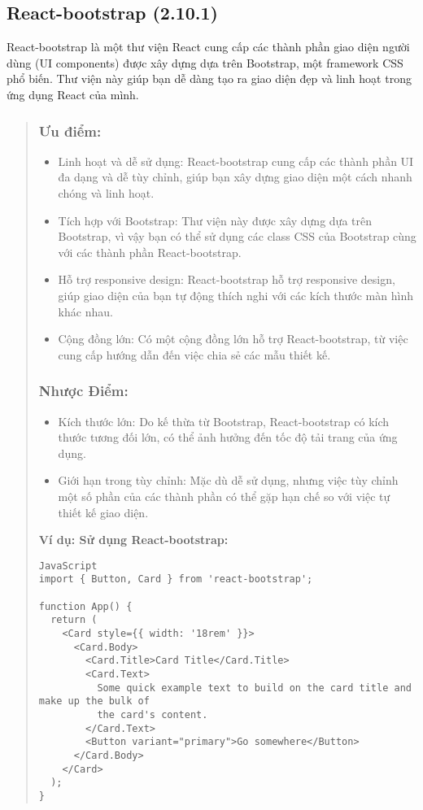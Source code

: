 \subsection{React-bootstrap (2.10.1)}

React-bootstrap là một thư viện React cung cấp các thành phần giao diện người dùng (UI components) được xây dựng dựa trên Bootstrap, một framework CSS phổ biến. Thư viện này giúp bạn dễ dàng tạo ra giao diện đẹp và linh hoạt trong ứng dụng React của mình.

\begin{quote}
\subsubsection{Ưu điểm:}
\begin{itemize}
  \item Linh hoạt và dễ sử dụng: React-bootstrap cung cấp các thành phần UI đa dạng và dễ tùy chỉnh, giúp bạn xây dựng giao diện một cách nhanh chóng và linh hoạt.
  \item Tích hợp với Bootstrap: Thư viện này được xây dựng dựa trên Bootstrap, vì vậy bạn có thể sử dụng các class CSS của Bootstrap cùng với các thành phần React-bootstrap.
  \item Hỗ trợ responsive design: React-bootstrap hỗ trợ responsive design, giúp giao diện của bạn tự động thích nghi với các kích thước màn hình khác nhau.
  \item Cộng đồng lớn: Có một cộng đồng lớn hỗ trợ React-bootstrap, từ việc cung cấp hướng dẫn đến việc chia sẻ các mẫu thiết kế.
\end{itemize}

\subsubsection{Nhược Điểm:}
\begin{itemize}
  \item Kích thước lớn: Do kế thừa từ Bootstrap, React-bootstrap có kích thước tương đối lớn, có thể ảnh hưởng đến tốc độ tải trang của ứng dụng.
  \item Giới hạn trong tùy chỉnh: Mặc dù dễ sử dụng, nhưng việc tùy chỉnh một số phần của các thành phần có thể gặp hạn chế so với việc tự thiết kế giao diện.
\end{itemize}

\textbf{Ví dụ: Sử dụng React-bootstrap:}
\begin{lstlisting}
JavaScript
import { Button, Card } from 'react-bootstrap';

function App() {
  return (
    <Card style={{ width: '18rem' }}>
      <Card.Body>
        <Card.Title>Card Title</Card.Title>
        <Card.Text>
          Some quick example text to build on the card title and make up the bulk of
          the card's content.
        </Card.Text>
        <Button variant="primary">Go somewhere</Button>
      </Card.Body>
    </Card>
  );
}
\end{lstlisting}
\end{quote}


